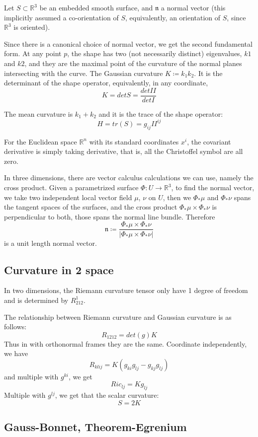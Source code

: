 \documentclass[main.tex]{subfiles}
\begin{document}
Let $S \subset \mathbb{R}^3$ be an embedded smooth surface, and $\mathfrak{n}$ a normal vector (this implicitly assumed a co-orientation of $S$, equivalently, an orientation of $S$, since $\mathbb{R}^3$ is oriented).

Since there is a canonical choice of normal vector, we get the second fundamental form. At any point $p$, the shape has two (not necessarily distinct) eigenvalues, $k1$ and $k2$, and they are the maximal point of the curvature of the normal planes intersecting with the curve. The Gaussian curvature $K \coloneqq k_1 k_2$. It is the determinant of the shape operator, equivalently, in any coordinate, 
$$
K = det S = \frac{det II}{det I}
$$

The mean curvature is $k_1 + k_2$ and it is the trace of the shape operator:
$$
H = tr(S) = g_{ij} II^{ij}
$$

For the Euclidean space $\mathbb{R}^n$ with its standard coordinates $x^i$, the covariant derivative is simply taking derivative, that is, all the Christoffel symbol are all zero.

In three dimensions, there are vector calculus calculations we can use, namely the cross product. Given a parametrized surface $\Phi: U \rightarrow \mathbb{R}^3$, to find the normal vector, we take two independent local vector field $\mu$, $\nu$ on $U$, then we $\Phi_* {\mu}$ and $\Phi_* \nu$ spans the tangent spaces of the surfaces, and the cross product $\Phi_* \mu \times \Phi_* \nu$ is perpendicular to both, those spans the normal line bundle. Therefore 
$$
\mathfrak{n} \coloneqq \frac{\Phi_* \mu \times \Phi_* \nu}{|\Phi_* \mu \times \Phi_* \nu|}
$$
is a unit length normal vector. 

\subsection{Curvature in 2 space}

In two dimensions, the Riemann curvature tensor only have 1 degree of freedom and is determined by 
$R^1 _{212}$. 

The relationship between Riemann curvature and Gaussian curvature is as follows:
$$
R_{1212} = det(g) K
$$
Thus in with orthonormal frames they are the same. Coordinate independently, we have 
$$
R_{klij} = K (g_{ki}g_{lj} - g_{kj}g_{lj})
$$
and multiple with $g^{ki}$, we get 
$$
Ric_{lj} = K g_{lj}
$$
Multiple with $g^{lj}$, we get that the scalar curvature:
$$
S = 2K
$$

\subsection{Gauss-Bonnet, Theorem-Egrenium}
\end{document}
